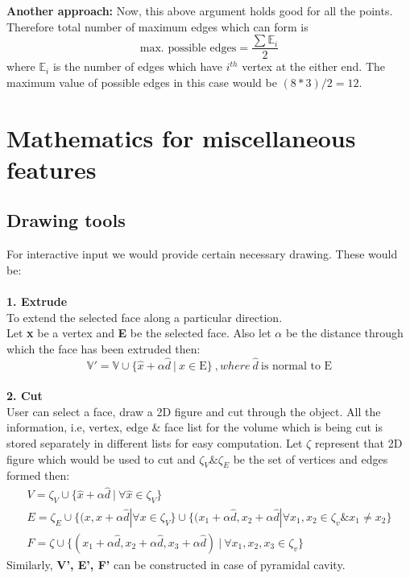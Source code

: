 \textbf{Another approach: }Now, this above argument holds good for all the points. Therefore total number of maximum edges which can form is 
$$
	\textrm{max. possible edges} = \frac{\sum{\mathbb {E}_{i}}}{2}
$$
where $\mathbb {E}_{i}$ is the number of edges which have $i^{th}$ vertex at the either end. The maximum value of possible edges in this case would be $(8 * 3) / 2 = 12$. 

\section{Mathematics for miscellaneous features}
\subsection{Drawing tools}
For interactive input we would provide certain necessary drawing. These would be: \\
\\
\indent \textbf{1. Extrude }\\
To extend the selected face along a particular direction. \\
Let \textbf{x} be a vertex and \textbf{E} be the selected face. Also let $\alpha$ be the distance through which the face has been extruded then:\\
$$ \mathbb{V}' = \mathbb{V} \cup \{ \hat{x} + \alpha\hat{d} \ | \  x \in \textrm{E} \} \ ,where \ \hat{d} \ \textrm{is normal to E} $$
\\
\indent \textbf{2. Cut}\\
User can select a face, draw a 2D figure and cut through the object. All the information, i.e, vertex, edge \& face list for the volume which is being cut is stored separately in different lists for easy computation. Let $\zeta$ represent that 2D figure which would be used to cut and $\zeta_{V} \& \zeta_{E}$ be the set of vertices and edges formed then:
\begin{gather} 
V = \zeta_{V} \cup \{\hat{x} + \alpha \hat{d} \ | \ \forall \hat{x} \in \zeta_{V} \} \\
E = \zeta_{E} \cup \{(x, x + \alpha \hat{d} | \forall x \in \zeta_{V}  \} \cup \{(x_1 + \alpha \hat{d}, x_2 + \alpha \hat{d} | \forall x_1, x_2 \in \zeta_{v} \& x_1 \neq x_2 \} \\
F = \zeta \cup \{(x_1 + \alpha \hat{d}, x_2 + \alpha \hat{d} , x_3 + \alpha \hat{d}) \ | \ \forall x_1, x_2, x_3 \in \zeta_{v} \}
\end{gather}
Similarly, \textbf{V', E', F'} can be constructed in case of pyramidal cavity.\\
